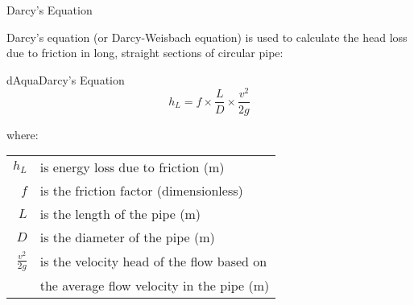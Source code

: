 \documentclass[9pt,xcolor=x11names,professionalfonts, mathserif]{beamer}
\begin{document}
			\begin{frame}{Darcy's Equation}
				\begin{cmini}[0.8]{
						Darcy's equation (or Darcy-Weisbach equation) is used to calculate the head loss due to friction in long, straight
						sections of circular pipe:
						}\end{cmini}
					\vspace{-0.5cm}
					\begin{cmini}[0.5]{
							\par\medskip
							\begin{cb}[15]{dAqua}{Darcy's Equation}{%
									\[  h_L=f\times \frac{L}{D}\times \frac{v^2}{2g} \]
									}\end{cb}
								\vspace{-0.5cm}
								where:
								\par\bigskip
								\begin{tabular}{rl}
									$h_L$             & is energy loss due to friction (m)        \\
									\addlinespace
									$f$               & is the friction factor (dimensionless)    \\
									\addlinespace
									$L$               & is the length of the pipe (m)             \\
									\addlinespace
									$D$               & is the diameter of the pipe (m)           \\
									\addlinespace
									$\tfrac{v^2}{2g}$ & is the velocity head of the flow based on \\&
									the average flow velocity in the pipe (m)\\
								\end{tabular}
								}\end{cmini}
								
								\end{frame}
								
\end{document}
